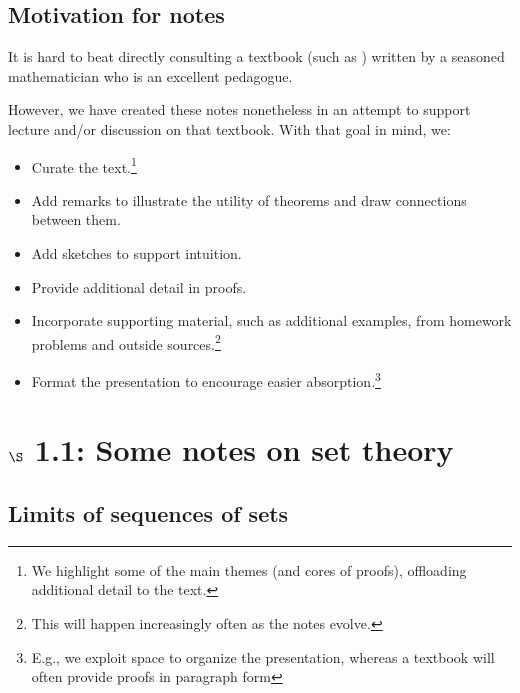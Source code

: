 \documentclass{article} %
\begin{document}
\subsection{Motivation for notes}

It is hard to beat directly consulting a textbook (such as \cite{ash2000probability}) written by a seasoned mathematician who is an excellent pedagogue.

However, we have created these notes nonetheless in an attempt to support lecture and/or discussion on that textbook.   With that goal in mind, we:
\begin{itemize}
\item Curate the text.\footnote{We highlight some of the main themes (and cores of proofs), offloading additional detail to the text.} 
\item Add remarks to illustrate the utility of theorems and draw connections between them.
\item Add sketches to support intuition.
\item Provide additional detail in proofs.
\item Incorporate supporting material, such as additional examples, from homework problems and outside sources.\footnote{This will happen increasingly often as the notes evolve.}
\item Format the presentation to encourage easier absorption.\footnote{E.g., we exploit space to organize the presentation, whereas a textbook will often provide proofs in paragraph form}
\end{itemize}





\section{$\S$ 1.1: Some notes on set theory}

\subsection{Limits of sequences of sets}
\end{document}
